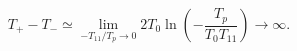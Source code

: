 \begin{equation}
T_{+}-T_{-}\simeq \lim_{-T_{11}/T_{p}\rightarrow 0}2T_{0}\ln
\left(-\frac{T_{p}}{T_{0}T_{11}}\right)\rightarrow \infty .
\end{equation}

